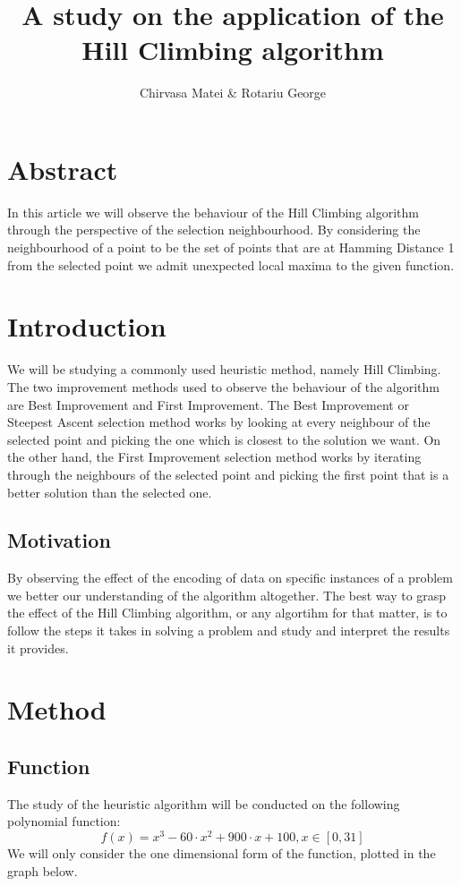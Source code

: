 \documentclass{article}
\author{Chirvasa Matei \& Rotariu George}
\title{A study on the application of the Hill Climbing algorithm}
\begin{document}
\maketitle

\section {Abstract}
In this article we will observe the behaviour of the Hill Climbing\cite{HC} algorithm through the perspective of the selection neighbourhood. By considering the neighbourhood of a point to be the set of points that are at Hamming Distance\cite{HD} 1 from the selected point we admit unexpected local maxima to the given function.

\section {Introduction}
We will be studying a commonly used heuristic method, namely Hill Climbing. The two improvement methods used to observe the behaviour of the algorithm are Best Improvement and First Improvement. The Best Improvement or Steepest Ascent selection method works by looking at every neighbour of the selected point and picking the one which is closest to the solution we want. On the other hand, the First Improvement selection method works by iterating through the neighbours of the selected point and picking the first point that is a better solution than the selected one.
\subsection{Motivation}
By observing the effect of the encoding of data on specific instances of a problem we better our understanding of the algorithm altogether. The best way to grasp the effect of the Hill Climbing algorithm, or any algortihm for that matter, is to follow the steps it takes in solving a problem and study and interpret the results it provides.


\section {Method}
\subsection{Function}
The study of the heuristic algorithm will be conducted on the following polynomial function:
$$f(x) = x^3 - 60 \cdot x^2 + 900 \cdot x + 100,
x \in \left[ 0, 31 \right]$$
We will only consider the one dimensional form of the function, plotted in the graph below.\\
\end{document}
